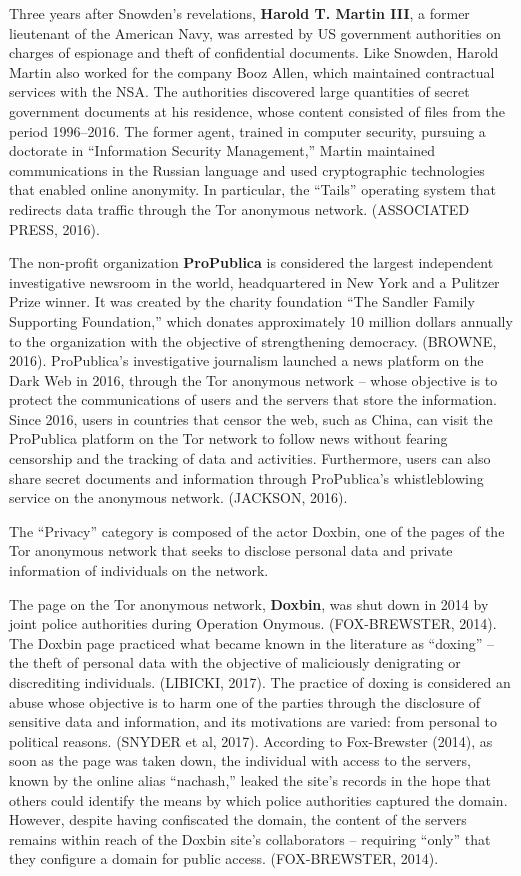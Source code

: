 Three years after Snowden's revelations, \textbf{Harold T. Martin III}, a former lieutenant of the American Navy, was arrested by US government authorities on charges of espionage and theft of confidential documents. Like Snowden, Harold Martin also worked for the company Booz Allen, which maintained contractual services with the NSA. The authorities discovered large quantities of secret government documents at his residence, whose content consisted of files from the period 1996--2016. The former agent, trained in computer security, pursuing a doctorate in ``Information Security Management,'' Martin maintained communications in the Russian language and used cryptographic technologies that enabled online anonymity. In particular, the ``Tails'' operating system that redirects data traffic through the Tor anonymous network. (ASSOCIATED PRESS, 2016).

The non-profit organization \textbf{ProPublica} is considered the largest independent investigative newsroom in the world, headquartered in New York and a Pulitzer Prize winner. It was created by the charity foundation ``The Sandler Family Supporting Foundation,'' which donates approximately 10 million dollars annually to the organization with the objective of strengthening democracy. (BROWNE, 2016). ProPublica's investigative journalism launched a news platform on the Dark Web in 2016, through the Tor anonymous network -- whose objective is to protect the communications of users and the servers that store the information. Since 2016, users in countries that censor the web, such as China, can visit the ProPublica platform on the Tor network to follow news without fearing censorship and the tracking of data and activities. Furthermore, users can also share secret documents and information through ProPublica's whistleblowing service on the anonymous network. (JACKSON, 2016).

The ``Privacy'' category is composed of the actor Doxbin, one of the pages of the Tor anonymous network that seeks to disclose personal data and private information of individuals on the network.

The page on the Tor anonymous network, \textbf{Doxbin}, was shut down in 2014 by joint police authorities during Operation Onymous. (FOX-BREWSTER, 2014). The Doxbin page practiced what became known in the literature as ``doxing'' -- the theft of personal data with the objective of maliciously denigrating or discrediting individuals. (LIBICKI, 2017). The practice of doxing is considered an abuse whose objective is to harm one of the parties through the disclosure of sensitive data and information, and its motivations are varied: from personal to political reasons. (SNYDER et al, 2017). According to Fox-Brewster (2014), as soon as the page was taken down, the individual with access to the servers, known by the online alias ``nachash,'' leaked the site's records in the hope that others could identify the means by which police authorities captured the domain. However, despite having confiscated the domain, the content of the servers remains within reach of the Doxbin site's collaborators -- requiring ``only'' that they configure a domain for public access. (FOX-BREWSTER, 2014).

